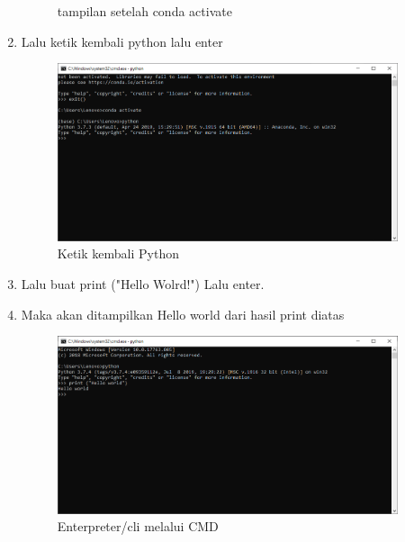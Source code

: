 \begin{enumerate}
\begin{figure}[!htpb]
				\centering
			\caption{tampilan setelah conda activate}
		\end{figure}
		\newpage
		\item Lalu ketik kembali python lalu enter
		\begin{figure}[!htpb]
			\includegraphics[width=10cm]{figures/envi4.PNG}
				\centering
			\caption{Ketik kembali Python}
		\end{figure}
        \item Lalu buat print ("Hello Wolrd!") Lalu enter.
        \item Maka akan ditampilkan Hello world dari hasil print diatas
        \begin{figure}[!htpb]
			\includegraphics[width=10cm]{figures/interpreter.PNG}
				\centering
			\caption{Enterpreter/cli melalui CMD}
		\end{figure}
    \end{enumerate}
    
    \newpage
